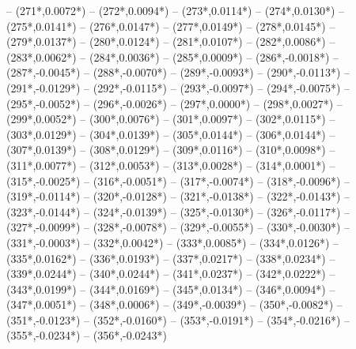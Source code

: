{		-- ({271*\dx},{0.0072*\dy})
		-- ({272*\dx},{0.0094*\dy})
		-- ({273*\dx},{0.0114*\dy})
		-- ({274*\dx},{0.0130*\dy})
		-- ({275*\dx},{0.0141*\dy})
		-- ({276*\dx},{0.0147*\dy})
		-- ({277*\dx},{0.0149*\dy})
		-- ({278*\dx},{0.0145*\dy})
		-- ({279*\dx},{0.0137*\dy})
		-- ({280*\dx},{0.0124*\dy})
		-- ({281*\dx},{0.0107*\dy})
		-- ({282*\dx},{0.0086*\dy})
		-- ({283*\dx},{0.0062*\dy})
		-- ({284*\dx},{0.0036*\dy})
		-- ({285*\dx},{0.0009*\dy})
		-- ({286*\dx},{-0.0018*\dy})
		-- ({287*\dx},{-0.0045*\dy})
		-- ({288*\dx},{-0.0070*\dy})
		-- ({289*\dx},{-0.0093*\dy})
		-- ({290*\dx},{-0.0113*\dy})
		-- ({291*\dx},{-0.0129*\dy})
		-- ({292*\dx},{-0.0115*\dy})
		-- ({293*\dx},{-0.0097*\dy})
		-- ({294*\dx},{-0.0075*\dy})
		-- ({295*\dx},{-0.0052*\dy})
		-- ({296*\dx},{-0.0026*\dy})
		-- ({297*\dx},{0.0000*\dy})
		-- ({298*\dx},{0.0027*\dy})
		-- ({299*\dx},{0.0052*\dy})
		-- ({300*\dx},{0.0076*\dy})
		-- ({301*\dx},{0.0097*\dy})
		-- ({302*\dx},{0.0115*\dy})
		-- ({303*\dx},{0.0129*\dy})
		-- ({304*\dx},{0.0139*\dy})
		-- ({305*\dx},{0.0144*\dy})
		-- ({306*\dx},{0.0144*\dy})
		-- ({307*\dx},{0.0139*\dy})
		-- ({308*\dx},{0.0129*\dy})
		-- ({309*\dx},{0.0116*\dy})
		-- ({310*\dx},{0.0098*\dy})
		-- ({311*\dx},{0.0077*\dy})
		-- ({312*\dx},{0.0053*\dy})
		-- ({313*\dx},{0.0028*\dy})
		-- ({314*\dx},{0.0001*\dy})
		-- ({315*\dx},{-0.0025*\dy})
		-- ({316*\dx},{-0.0051*\dy})
		-- ({317*\dx},{-0.0074*\dy})
		-- ({318*\dx},{-0.0096*\dy})
		-- ({319*\dx},{-0.0114*\dy})
		-- ({320*\dx},{-0.0128*\dy})
		-- ({321*\dx},{-0.0138*\dy})
		-- ({322*\dx},{-0.0143*\dy})
		-- ({323*\dx},{-0.0144*\dy})
		-- ({324*\dx},{-0.0139*\dy})
		-- ({325*\dx},{-0.0130*\dy})
		-- ({326*\dx},{-0.0117*\dy})
		-- ({327*\dx},{-0.0099*\dy})
		-- ({328*\dx},{-0.0078*\dy})
		-- ({329*\dx},{-0.0055*\dy})
		-- ({330*\dx},{-0.0030*\dy})
		-- ({331*\dx},{-0.0003*\dy})
		-- ({332*\dx},{0.0042*\dy})
		-- ({333*\dx},{0.0085*\dy})
		-- ({334*\dx},{0.0126*\dy})
		-- ({335*\dx},{0.0162*\dy})
		-- ({336*\dx},{0.0193*\dy})
		-- ({337*\dx},{0.0217*\dy})
		-- ({338*\dx},{0.0234*\dy})
		-- ({339*\dx},{0.0244*\dy})
		-- ({340*\dx},{0.0244*\dy})
		-- ({341*\dx},{0.0237*\dy})
		-- ({342*\dx},{0.0222*\dy})
		-- ({343*\dx},{0.0199*\dy})
		-- ({344*\dx},{0.0169*\dy})
		-- ({345*\dx},{0.0134*\dy})
		-- ({346*\dx},{0.0094*\dy})
		-- ({347*\dx},{0.0051*\dy})
		-- ({348*\dx},{0.0006*\dy})
		-- ({349*\dx},{-0.0039*\dy})
		-- ({350*\dx},{-0.0082*\dy})
		-- ({351*\dx},{-0.0123*\dy})
		-- ({352*\dx},{-0.0160*\dy})
		-- ({353*\dx},{-0.0191*\dy})
		-- ({354*\dx},{-0.0216*\dy})
		-- ({355*\dx},{-0.0234*\dy})
		-- ({356*\dx},{-0.0243*\dy})
}
